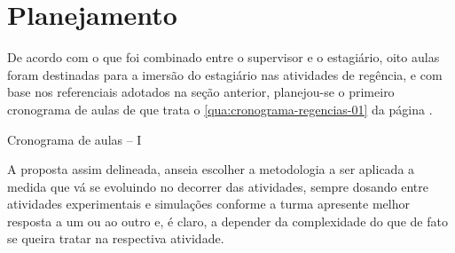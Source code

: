 \section{Planejamento}
De acordo com o que foi combinado entre o supervisor e o estagiário, oito aulas foram destinadas para a imersão do estagiário nas atividades de regência, e com base nos referenciais adotados na seção anterior, planejou-se o primeiro cronograma de aulas de que trata o \autoref{qua:cronograma-regencias-01} da página \pageref{qua:cronograma-regencias-01}.
\vspace{15pt}
\begin{quadro}[!ht]
    \centering
    \caption{Cronograma de aulas -- I}
    \label{qua:cronograma-regencias-01}
\end{quadro}
\vspace{15pt}

A proposta assim delineada, anseia escolher a metodologia a ser aplicada a medida que vá se evoluindo no decorrer das atividades, sempre dosando entre atividades experimentais e simulações conforme a turma apresente melhor resposta a um ou ao outro e, é claro, a depender da complexidade do que de fato se queira tratar na respectiva atividade.


